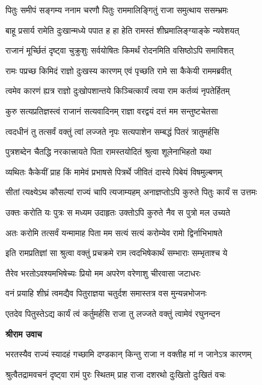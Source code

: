 \twolineshloka
{पितुः समीपं सङ्गम्य ननाम चरणौ पितुः}
{राममालिङ्गितुं राजा समुत्थाय ससम्भ्रमः} %

\twolineshloka
{बाहू प्रसार्य रामेति दुःखान्मध्ये पपात ह}
{हा हेति रामस्तं शीघ्रमालिङ्ग्याङ्के न्यवेशयत्} %

\twolineshloka
{राजानं मूर्च्छितं दृष्ट्वा चुक्रुशुः सर्वयोषितः}
{किमर्थं रोदनमिति वसिष्ठोऽपि समाविशत्} %

\twolineshloka
{रामः पप्रच्छ किमिदं राज्ञो दुःखस्य कारणम्}
{एवं पृच्छति रामे सा कैकेयी राममब्रवीत्} %

\twolineshloka
{त्वमेव कारणं ह्यत्र राज्ञो दुःखोपशान्तये}
{किञ्चित्कार्यं त्वया राम कर्तव्यं नृपतेर्हितम्} %

\twolineshloka
{कुरु सत्यप्रतिज्ञस्त्वं राजानं सत्यवादिनम्}
{राज्ञा वरद्वयं दत्तं मम सन्तुष्टचेतसा} %

\twolineshloka
{त्वदधीनं तु तत्सर्वं वक्तुं त्वां लज्जते नृपः}
{सत्यपाशेन सम्बद्धं पितरं त्रातुमर्हसि} %

\twolineshloka
{पुत्रशब्देन चैतद्धि नरकात्त्रायते पिता}
{रामस्तयोदितं श्रुत्वा शूलेनाभिहतो यथा} %

\twolineshloka
{व्यथितः कैकेयीं प्राह किं मामेवं प्रभाषसे}
{पित्रर्थे जीवितं दास्ये पिबेयं विषमुल्बणम्} %

\twolineshloka
{सीतां त्यक्ष्येऽथ कौसल्यां राज्यं चापि त्यजाम्यहम्}
{अनाज्ञप्तोऽपि कुरुते पितुः कार्यं स उत्तमः} %

\twolineshloka
{उक्तः करोति यः पुत्रः स मध्यम उदाहृतः}
{उक्तोऽपि कुरुते नैव स पुत्रो मल उच्यते} %

\twolineshloka
{अतः करोमि तत्सर्वं यन्मामाह पिता मम}
{सत्यं सत्यं करोम्येव रामो द्विर्नाभिभाषते} %

\twolineshloka
{इति रामप्रतिज्ञां सा श्रुत्वा वक्तुं प्रचक्रमे}
{राम त्वदभिषेकार्थं सम्भाराः सम्भृताश्च ये} %

\twolineshloka
{तैरेव भरतोऽवश्यमभिषेच्यः प्रियो मम}
{अपरेण वरेणाशु चीरवासा जटाधरः} %

\twolineshloka
{वनं प्रयाहि शीघ्रं त्वमद्यैव पितुराज्ञया}
{चतुर्दश समास्तत्र वस मुन्यन्नभोजनः} %

\twolineshloka
{एतदेव पितुस्तेऽद्य कार्यं त्वं कर्तुमर्हसि}
{राजा तु लज्जते वक्तुं त्वामेवं रघुनन्दन} %

\textbf{श्रीराम उवाच}

\twolineshloka
{भरतस्यैव राज्यं स्यादहं गच्छामि दण्डकान्}
{किन्तु राजा न वक्तीह मां न जानेऽत्र कारणम्} %

\twolineshloka
{श्रुत्वैतद्रामवचनं दृष्ट्वा रामं पुरः स्थितम्}
{प्राह राजा दशरथो दुःखितो दुःखितं वचः} %

